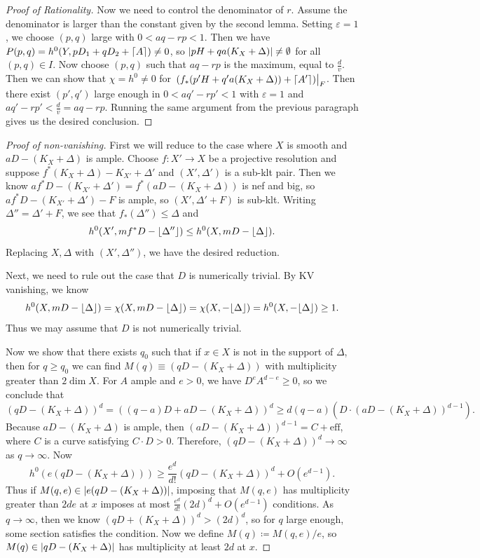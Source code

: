 \documentclass[leqno, openany]{memoir}
\DeclarePairedDelimiter{\floor}{\lfloor}{\rfloor}
\DeclarePairedDelimiter{\ceil}{\lceil}{\rceil}
\theoremstyle{definition}
\theoremstyle{remark}
\theoremstyle{plain}
\theoremstyle{definition}
\theoremstyle{remark}
\newcommand{\ep}{\varepsilon}
\begin{document}
\begin{proof}[Proof of Rationality]
    Now we need to control the denominator of $r$. Assume the denominator is larger than the constant given by the second lemma. Setting $\ep = 1$, we choose $(p,q)$ large with $0 < aq - rp < 1$. Then we have $P(p,q) = h^0(Y, pD_1 + qD_2 + \ceil{A}) \neq 0$, so $\abs{pH + qa(K_X + \Delta)} \neq \emptyset$ for all $(p,q) \in I$. Now choose $(p,q)$ such that $aq-rp$ is the maximum, equal to $\frac{d}{v}$. Then we can show that $\chi = h^0 \neq 0$ for $\eval{(f_*(p'H + q'a(K_X + \Delta)) + \ceil{A'})}_F$. Then there exist $(p',q')$ large enough in $0 < aq' - rp' < 1$ with $\ep = 1$ and $aq' - rp' < \frac{d}{v} = aq-rp$. Running the same argument from the previous paragraph gives us the desired conclusion.
\end{proof}

\begin{proof}[Proof of non-vanishing]
    First we will reduce to the case where $X$ is smooth and $aD - (K_X + \Delta)$ is ample. Choose $f \colon X' \to X$ be a projective resolution and suppose $f^*(K_X + \Delta) - K_{X'} + \Delta'$ and $(X', \Delta')$ is a sub-klt pair. Then we know $af^*D - (K_{X'}+\Delta') = f^*(aD - (K_X + \Delta))$ is nef and big, so $af^*D - (K_{X'}+\Delta')-F$ is ample, so $(X', \Delta' + F)$ is sub-klt. Writing $\Delta'' = \Delta' + F$, we see that $f_* (\Delta'') \leq \Delta$ and
    \[ h^0(X', mf^* D - \floor{\Delta''}) \leq h^0(X, mD - \floor{\Delta}). \]
    Replacing $X, \Delta$ with $(X', \Delta'')$, we have the desired reduction.

    Next, we need to rule out the case that $D$ is numerically trivial. By KV vanishing, we know
    \[ h^0(X, mD - \floor{\Delta}) = \chi(X, mD - \floor{\Delta}) = \chi(X, -\floor{\Delta}) = h^0(X, -\floor{\Delta}) \geq 1. \]
    Thus we may assume that $D$ is not numerically trivial.

    Now we show that there exists $q_0$ such that if $x \in X$ is not in the support of $\Delta$, then for $q \geq q_0$ we can find $M(q) \equiv (qD - (K_X + \Delta))$ with multiplicity greater than $2 \dim X$. For $A$ ample and $e > 0$, we have $D^e A^{d-e} \geq 0$, so we conclude that 
    \[ {(qD - (K_X + \Delta))}^d = { ((q-a)D + aD - (K_X + \Delta)) }^d \geq d(q-a) (D \cdot {(aD - (K_X + \Delta))}^{d-1}). \]
    Because $aD - (K_X + \Delta)$ is ample, then ${(aD - (K_X + \Delta))}^{d-1} = C + \text{eff}$, where $C$ is a curve satisfying $C\cdot D > 0$. Therefore, ${(qD - (K_X + \Delta))}^d \to \infty$ as $q \to \infty$. Now
    \[ h^0(e(qD - (K_X + \Delta))) \geq \frac{e^d}{d!} {(qD - (K_X + \Delta))}^d + O(e^{d-1}). \]
    Thus if $M(q,e) \in \abs{e(qD - (K_X + \Delta))}$, imposing that $M(q,e)$ has multiplicity greater than $2de$ at $x$ imposes at most $\frac{e^d}{d!} {(2d)}^d + O(e^{d-1})$ conditions. As $q \to \infty$, then we know ${(qD + (K_X + \Delta))}^d > {(2d)}^d$, so for $q$ large enough, some section satisfies the condition. Now we define $M(q) \coloneqq M(q,e)/e$, so $M(q) \in \abs{qD - (K_X + \Delta)}$ has multiplicity at least $2d$ at $x$.


\end{proof}
\end{document}
